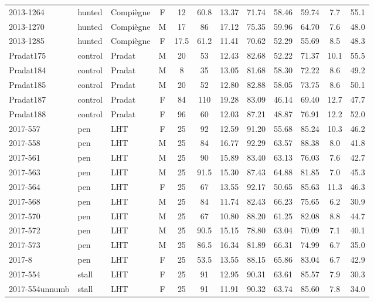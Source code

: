 \documentclass[12pt,a4paper]{article}
\begin{document}
\begin{landscape}
\begin{table}[!htbp]
\begin{tabular}{@{}lllccccccccc@{}}
    2013-1264 & hunted & Compiègne & F & 12 & 60.8 & 13.37 & 71.74 & 58.46 & 59.74 & 7.7 & 55.1 \\
    2013-1270 & hunted & Compiègne & M & 17 & 86 & 17.12 & 75.35 & 59.96 & 64.70 & 7.6 & 48.0 \\
    2013-1285 & hunted & Compiègne & F & 17.5 & 61.2 & 11.41 & 70.62 & 52.29 & 55.69 & 8.5 & 48.3 \\
    Pradat175 & control & Pradat & M & 20 & 53 & 12.43 & 82.68 & 52.22 & 71.37 & 10.1 & 55.5 \\
    Pradat184 & control & Pradat & M & 8 & 35 & 13.05 & 81.68 & 58.30 & 72.22 & 8.6 & 49.2 \\
    Pradat185 & control & Pradat & M & 20 & 52 & 12.80 & 82.88 & 58.05 & 73.75 & 8.6 & 50.1 \\
    Pradat187 & control & Pradat & F & 84 & 110 & 19.28 & 83.09 & 46.14 & 69.40 & 12.7 & 47.7 \\
    Pradat188 & control & Pradat & F & 96 & 60 & 12.03 & 87.21 & 48.87 & 76.91 & 12.2 & 52.0 \\
    2017-557 & pen & LHT & F & 25 & 92 & 12.59 & 91.20 & 55.68 & 85.24 & 10.3 & 46.2 \\
    2017-558 & pen & LHT & M & 25 & 84 & 16.77 & 92.29 & 63.57 & 88.38 & 8.0 & 41.8 \\
    2017-561 & pen & LHT & M & 25 & 90 & 15.89 & 83.40 & 63.13 & 76.03 & 7.6 & 42.7 \\
    2017-563 & pen & LHT & M & 25 & 91.5 & 15.30 & 87.43 & 64.88 & 81.85 & 7.0 & 45.3 \\
    2017-564 & pen & LHT & F & 25 & 67 & 13.55 & 92.17 & 50.65 & 85.63 & 11.3 & 46.3 \\
    2017-568 & pen & LHT & M & 25 & 84 & 11.74 & 82.43 & 66.23 & 75.65 & 6.2 & 30.9 \\
    2017-570 & pen & LHT & M & 25 & 67 & 10.80 & 88.20 & 61.25 & 82.08 & 8.8 & 44.7 \\
    2017-572 & pen & LHT & M & 25 & 90.5 & 15.15 & 78.80 & 63.04 & 70.09 & 7.1 & 40.1 \\
    2017-573 & pen & LHT & M & 25 & 86.5 & 16.34 & 81.89 & 66.31 & 74.99 & 6.7 & 35.0 \\
    2017-8 & pen & LHT & F & 25 & 53.5 & 13.55 & 88.15 & 65.86 & 83.04 & 6.7 & 42.9 \\
    2017-554 & stall & LHT & F & 25 & 91 & 12.95 & 90.31 & 63.61 & 85.57 & 7.9 & 30.3 \\
    2017-554unnumb & stall & LHT & F & 25 & 91 & 11.91 & 90.32 & 63.74 & 85.60 & 7.8 & 34.0 \\

\end{tabular}
\end{table}
\end{landscape}
\end{document}
